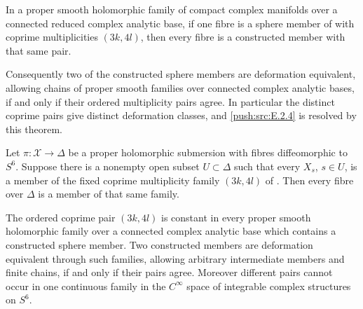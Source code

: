 
\begin{theorem}\hypertarget{tag-0339}{}\label{push:src:E.2.23}


In a proper smooth holomorphic family of compact complex
manifolds over a connected reduced complex analytic base,
if one fibre is a sphere member of  with coprime
multiplicities $(3k,4l)$, then every fibre is a constructed
member with that same pair.

Consequently two of the constructed sphere members are
deformation equivalent, allowing chains of proper smooth
families over connected complex analytic bases, if and
only if their ordered multiplicity pairs agree.  In
particular the distinct coprime pairs give distinct
deformation classes, and \ref{push:src:E.2.4} is resolved by this theorem.
\end{theorem}

\begin{proposition}\hypertarget{tag-0338}{}\label{push:src:E.2.22}


Let $\pi:\mathcal X\to\Delta$ be a proper holomorphic
submersion with fibres diffeomorphic to $S^6$.  Suppose
there is a nonempty open subset $U\subset\Delta$ such
that every $X_s$, $s\in U$, is a member of the fixed
coprime multiplicity family $(3k,4l)$ of .
Then every fibre over $\Delta$ is a member of that
same family.
\end{proposition}

\begin{corollary}\hypertarget{tag-033C}{}\label{push:src:E.2.4}


The ordered coprime pair $(3k,4l)$ is constant in every
proper smooth holomorphic family over a connected complex
analytic base which contains a constructed sphere member.
Two constructed members are deformation equivalent through
such families, allowing arbitrary intermediate members and
finite chains, if and only if their pairs agree.
Moreover different pairs cannot occur in one continuous
family in the $C^\infty$ space of integrable complex
structures on $S^6$.
\end{corollary}

